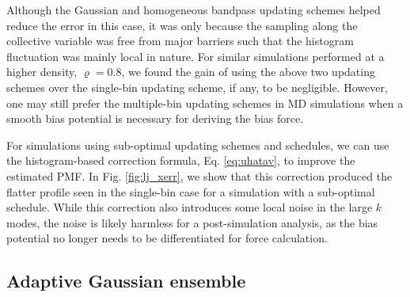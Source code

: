 \documentclass[reprint, superscriptaddress, floatfix]{revtex4-1}
\begin{document}
Although the Gaussian and homogeneous bandpass updating schemes
helped reduce the error in this case,
it was only because
the sampling along the collective variable
was free from major barriers
such that the histogram fluctuation was mainly local in nature.
%
For similar simulations performed at a higher density, $\varrho = 0.8$,
we found the gain of using the above two updating schemes
over the single-bin updating scheme, if any, to be negligible.
%
However, one may still prefer the multiple-bin updating schemes
in MD simulations
when a smooth bias potential is necessary
for deriving the bias force.

For simulations using sub-optimal
updating schemes and schedules,
we can use the histogram-based correction formula,
Eq. \eqref{eq:uhatav},
to improve the estimated PMF.
%
In Fig. \ref{fig:lj_xerr},
we show that this correction produced
the flatter profile seen in the single-bin case
for a simulation with a sub-optimal schedule.
%
While this correction also introduces
some local noise in the large $k$ modes,
the noise is likely harmless
for a post-simulation analysis, as
the bias potential no longer needs to be differentiated
for force calculation.
%





\subsection{\label{sec:potts}
Adaptive Gaussian ensemble}
\end{document}
